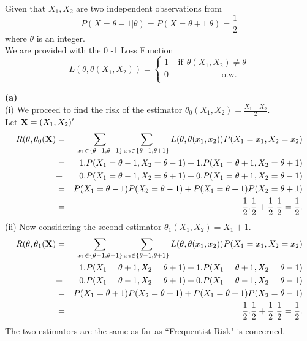 Given that $X_1, X_2$ are two independent observations from
\begin{equation*}
P(X=\theta-1|\theta)=P(X=\theta+1|\theta)=\frac{1}{2}
\end{equation*}
where $\theta$ is an integer. \\
We are provided with the 0 -1 Loss Function
$$
L(\theta,\theta(X_1,X_2))=\left\{\begin{array}{c}
1\:\:\:\:\:\mbox{if}\:\:\theta(X_1,X_2)\neq \theta\\
0\:\:\:\:\:\:\:\:\:\:\:\:\:\:\:\:\:\:\:\:\:\:\:\:\:\:\:\:\mbox{o.w.}\\
\end{array}
\right.
$$

\textbf{(a)} \\(i) We proceed to find the risk of the estimator $\theta_0(X_1,X_2)=\frac{X_1+X_2}{2}$. \\
Let $\hbox{\bf X}=(X_1,X_2)'$
\begin{eqnarray}
R(\theta,\theta_0(\hbox{\bf X}) &=& \sum_{x_1\in\{\theta-1,\theta+1\}}\sum_{x_2\in\{\theta-1,\theta+1\}}L(\theta,\theta(x_1,x_2))P(X_1=x_1,X_2=x_2)\nonumber\\
&=& 1. P(X_1=\theta-1,X_2=\theta-1)+1.P(X_1=\theta+1,X_2=\theta+1)\nonumber\\
&+& 0.P(X_1=\theta-1,X_2=\theta+1)+0.P(X_1=\theta+1,X_2=\theta-1)\nonumber\\
&=& P(X_1=\theta-1)P(X_2=\theta-1)+P(X_1=\theta+1)P(X_2=\theta+1)\nonumber\\
&=& {{1}\over{2}}.{{1}\over{2}}+{{1}\over{2}}.{{1}\over{2}}={{1}\over{2}}.\nonumber
\end{eqnarray}
(ii) Now considering the second estimator $\theta_1(X_1,X_2)=X_1+1$.
\begin{eqnarray}
R(\theta,\theta_1(\hbox{\bf X}) &=& \sum_{x_1\in\{\theta-1,\theta+1\}}\sum_{x_2\in\{\theta-1,\theta+1\}}L(\theta,\theta(x_1,x_2))P(X_1=x_1,X_2=x_2)\nonumber\\
&=& 1. P(X_1=\theta+1,X_2=\theta+1)+1.P(X_1=\theta+1,X_2=\theta-1)\nonumber\\
&+& 0.P(X_1=\theta-1,X_2=\theta+1)+0.P(X_1=\theta-1,X_2=\theta-1)\nonumber\\
&=& P(X_1=\theta+1)P(X_2=\theta+1)+P(X_1=\theta+1)P(X_2=\theta-1)\nonumber\\
&=& {{1}\over{2}}.{{1}\over{2}}+{{1}\over{2}}.{{1}\over{2}}={{1}\over{2}}.\nonumber
\end{eqnarray}
The two estimators are the same as far as ``Frequentist Risk" is concerned.\\



